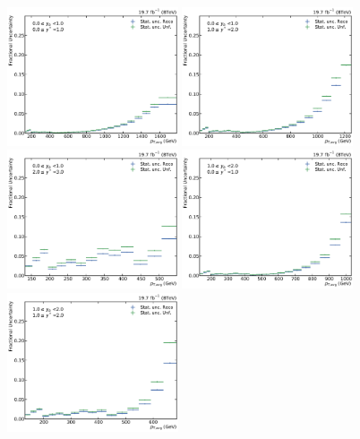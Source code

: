 \begin{figure}[htbp]
    \centering
    \includegraphics[width=0.45\textwidth]{figures/measurement/statunc_fractional_yb0ys0.pdf}\hfill
    \includegraphics[width=0.45\textwidth]{figures/measurement/statunc_fractional_yb0ys1.pdf}
    \includegraphics[width=0.45\textwidth]{figures/measurement/statunc_fractional_yb0ys2.pdf}\hfill
    \includegraphics[width=0.45\textwidth]{figures/measurement/statunc_fractional_yb1ys0.pdf}
    \includegraphics[width=0.45\textwidth]{figures/measurement/statunc_fractional_yb1ys1.pdf}\hfill

\end{figure}
